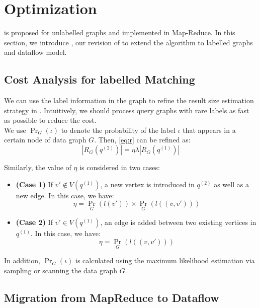 \section{Optimization}
\label{sec:opt}

\cliquejoin is proposed for unlabelled graphs and implemented in Map-Reduce. In this section, we introduce \gencliqjoin, our revision of \cliquejoin to extend the algorithm to labelled graphs and dataflow model.

\subsection{Cost Analysis for labelled Matching}

We can use the label information in the graph to refine the result size estimation strategy in \gencliqjoin. Intuitively, we should process query graphs with rare labels as fast as possible to reduce the cost. \\

We use $\Pr_{G}(\iota)$ to denote the probability of the label $\iota$ that appears in a certain node of data graph $G$. Then, \eqref{eq:r} can be refined as:
\begin{equation} \label{eq:rr}
|R_{G}(q^{(2)})|=\eta\lambda |R_{G}(q^{(1)})|
\end{equation}

Similarly, the value of $\eta$ is considered in two cases:

\begin{itemize}
\item \textbf{(Case 1)} If $v'\not\in V(q^{(1)})$, a new vertex is introduced in $q^{(2)}$ as well as a new edge. In this case, we have:
\begin{equation} \label{eq6-new}
 \textstyle \eta = \Pr_{G}(l(v')) \times \Pr_{G}(l((v,v')))
\end{equation}

\item \textbf{(Case 2)} If $v'\in V(q^{(1)})$, an edge is added between two existing vertices in $q^{(1)}$. In this case, we have:
\begin{equation} \label{eq:7-new}
\textstyle \eta = \Pr_{G}(l((v,v')))
\end{equation}
\end{itemize}

In addition, $\Pr_{G} (\iota)$ is calculated using the maximum likelihood estimation via sampling or scanning the data graph $G$.

\subsection{Migration from MapReduce to Dataflow} \label{to-df}

